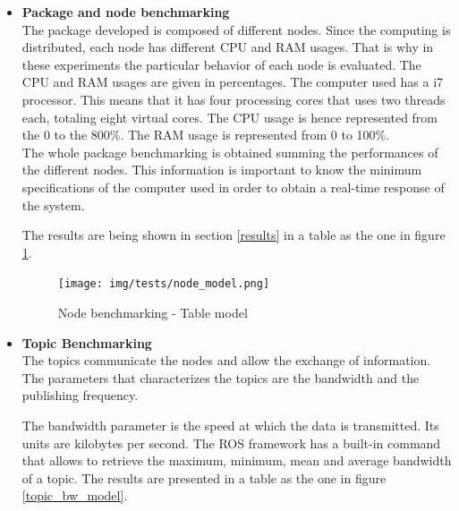 	\begin{itemize}


		\item{\textbf{Package and node benchmarking}}
		\\
		The package developed is composed of different nodes. 
		Since the computing is distributed, each node has different CPU and RAM usages.
		That is why in these experiments the particular behavior of each node is evaluated. 
		The CPU and RAM usages are given in percentages. 
		The computer used has a i7 processor. 
		This means that it has four processing cores that uses two threads each, totaling eight virtual cores. 
		The CPU usage is hence represented from the 0 to the 800\%.
		The RAM usage is represented from 0 to 100\%.
		\\[0.5cm]

		The whole package benchmarking is obtained summing the performances of the different nodes. 
		This information is important to know the minimum specifications of the computer used in order to obtain a real-time response of the system.  

		The results are being shown in section \ref{results} in a table as the one in figure \ref{node_model}.

		\begin{figure}[H]
				\begin{center}
			    \texttt{[image: img/tests/node\_model.png]}
				\caption[Node benchmarking - Table model]{Node benchmarking - Table model}
								\label{node_model}

				\end{center}
		\end{figure}

		\item{\textbf{Topic Benchmarking}}\\
		The topics communicate the nodes and allow the exchange of information. 
		The parameters that characterizes the topics are the bandwidth and the publishing frequency.
	
		The bandwidth parameter is the speed at which the data is transmitted. 
		Its units are kilobytes per second. 
		The ROS framework has a built-in command that allows to retrieve the maximum, minimum, mean and average bandwidth of a topic. 
		The results are presented in a table as the one in figure \ref{topic_bw_model}. 


\end{itemize}
